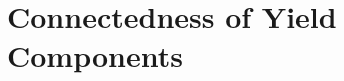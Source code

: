 \begin{appendices}
\begin{landscape}
	
\end{landscape}

%	

\renewcommand\thefigure{\thesection.\arabic{figure}}
\section{Connectedness of Yield Components}
\setcounter{figure}{0}




\end{appendices}
